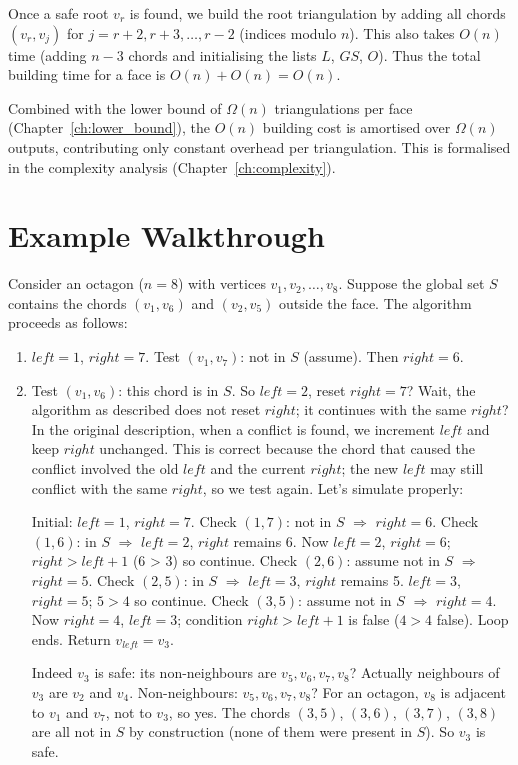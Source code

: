 Once a safe root $v_r$ is found, we build the root triangulation by adding all chords $(v_r, v_j)$ for $j = r+2, r+3, \dots, r-2$ (indices modulo $n$). 
This also takes $O(n)$ time (adding $n-3$ chords and initialising the lists $L$, $GS$, $O$). 
Thus the total building time for a face is $O(n) + O(n) = O(n)$.

Combined with the lower bound of $\Omega(n)$ triangulations per face (Chapter~\ref{ch:lower_bound}), the $O(n)$ building cost is amortised over $\Omega(n)$ outputs, contributing only constant overhead per triangulation. 
This is formalised in the complexity analysis (Chapter~\ref{ch:complexity}).

\section{Example Walkthrough}
\label{sec:two_pointer_example}

Consider an octagon ($n=8$) with vertices $v_1, v_2, \dots, v_8$. 
Suppose the global set $S$ contains the chords $(v_1, v_6)$ and $(v_2, v_5)$ outside the face. 
The algorithm proceeds as follows:

\begin{enumerate}
    \item $left = 1$, $right = 7$. Test $(v_1, v_7)$: not in $S$ (assume). Then $right = 6$.
    \item Test $(v_1, v_6)$: this chord is in $S$. So $left = 2$, reset $right = 7$? Wait, the algorithm as described does not reset $right$; it continues with the same $right$? 
    In the original description, when a conflict is found, we increment $left$ and keep $right$ unchanged. 
    This is correct because the chord that caused the conflict involved the old $left$ and the current $right$; the new $left$ may still conflict with the same $right$, so we test again.
    Let's simulate properly:
    
    Initial: $left=1$, $right=7$.
    Check $(1,7)$: not in $S$ $\Rightarrow$ $right=6$.
    Check $(1,6)$: in $S$ $\Rightarrow$ $left=2$, $right$ remains 6.
    Now $left=2$, $right=6$; $right > left+1$ (6 > 3) so continue.
    Check $(2,6)$: assume not in $S$ $\Rightarrow$ $right=5$.
    Check $(2,5)$: in $S$ $\Rightarrow$ $left=3$, $right$ remains 5.
    $left=3$, $right=5$; $5 > 4$ so continue.
    Check $(3,5)$: assume not in $S$ $\Rightarrow$ $right=4$.
    Now $right = 4$, $left=3$; condition $right > left+1$ is false ($4 > 4$ false). Loop ends.
    Return $v_{left}=v_3$.
    
    Indeed $v_3$ is safe: its non-neighbours are $v_5, v_6, v_7, v_8$? Actually neighbours of $v_3$ are $v_2$ and $v_4$. Non-neighbours: $v_5, v_6, v_7, v_8$? For an octagon, $v_8$ is adjacent to $v_1$ and $v_7$, not to $v_3$, so yes. The chords $(3,5)$, $(3,6)$, $(3,7)$, $(3,8)$ are all not in $S$ by construction (none of them were present in $S$). So $v_3$ is safe.
\end{enumerate}

